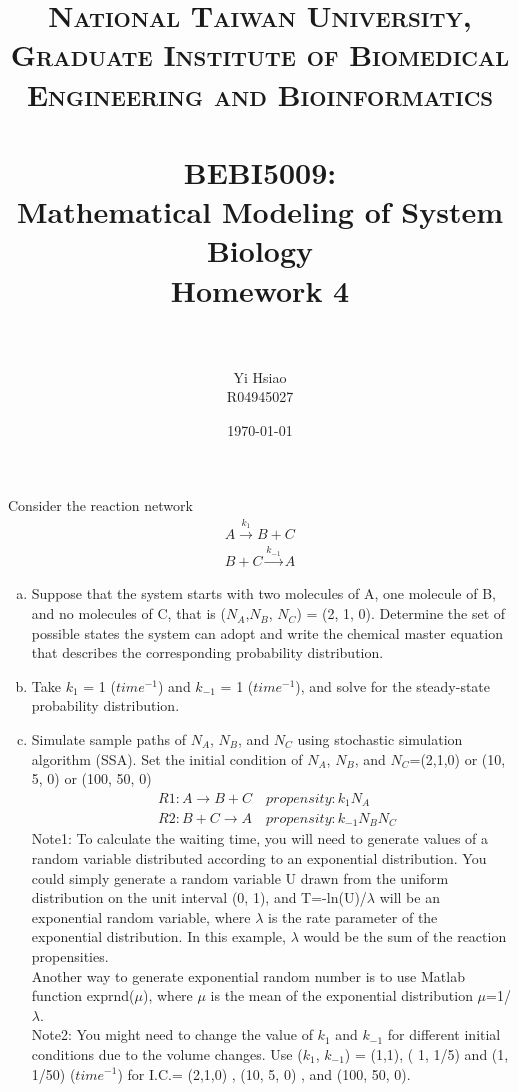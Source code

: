 \documentclass[paper=a4, fontsize=11pt]{scrartcl} %
\title{	
\normalfont \normalsize 
\textsc{National Taiwan University, \\ Graduate Institute of Biomedical Engineering and Bioinformatics} \\ [25pt] %
\horrule{0.5pt} \\[0.4cm] %
\huge BEBI5009:\\Mathematical Modeling of System Biology \\ Homework 4 \\ %
\horrule{2pt} \\[0.5cm] %
}
\author{Yi Hsiao\\R04945027} %
\date{\normalsize\today} %
\numberwithin{equation}{section} %
\numberwithin{figure}{section} %
\numberwithin{table}{section} %
\begin{document}
\maketitle %

\newpage
\section{}
Consider the reaction network
	\begin{gather*}
			A \xrightarrow{k_1} B + C \\
			B + C \xrightarrow{k_{-1}} A
	\end{gather*}
	\begin{enumerate}[a)]
		\item  Suppose that the system starts with two molecules of A, one molecule of B, and no molecules of C, that is ($N_A$,$N_B$, $N_C$) = (2, 1, 0). Determine the set of possible states the system can adopt and write the chemical master equation that describes the corresponding probability distribution.

		\item Take $k_1$ = 1 ($time^{-1}$) and $k_{-1}$ = 1 ($time^{-1}$), and solve for the steady-state probability distribution.

		\item  Simulate sample paths of $N_A$, $N_B$, and $N_C$ using stochastic simulation algorithm (SSA). Set the initial condition of $N_A$, $N_B$, and $N_C$=(2,1,0) or (10, 5, 0) or (100, 50, 0)
		\begin{align*}
			&R1: A \xrightarrow{} B + C \quad propensity: k_1N_A \\
			&R2: B + C \xrightarrow{} A \quad propensity: k_{-1}N_BN_C
		\end{align*}
		Note1: To calculate the waiting time, you will need to generate values of a random variable distributed according to an exponential distribution. You could simply generate a random variable U drawn from the uniform distribution on the unit interval (0, 1), and T=-ln(U)/$\lambda$ will be an exponential random variable, where $\lambda$ is the rate parameter of the exponential distribution. In this example, $\lambda$ would be the sum of the reaction propensities. \\
		Another way to generate exponential random number is to use Matlab function exprnd($\mu$), where $\mu$ is the mean of the exponential distribution $\mu$=1/$\lambda$. \\
		Note2: You might need to change the value of $k_1$ and $k_{-1}$ for different initial conditions due to the volume changes. Use ($k_1$, $k_{-1}$) = (1,1), ( 1, 1/5) and (1, 1/50) ($time^{-1}$) for I.C.= (2,1,0) , (10, 5, 0) , and (100, 50, 0).


\end{enumerate}
\end{document}
